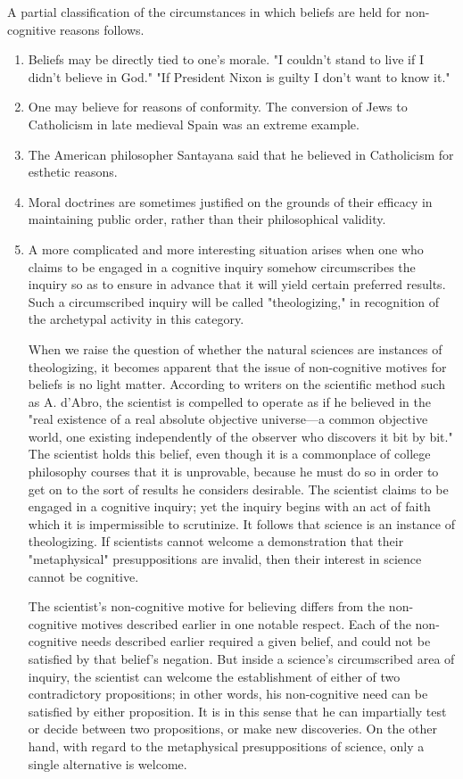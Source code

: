 \documentclass[10pt,twoside,draft]{memoir}
\begin{document}
A partial classification of the circumstances in which beliefs are held for 
non-cognitive reasons follows. 

\begin{enumerate}
\item Beliefs may be directly tied to one's morale. "I couldn't stand to live if I didn't believe in God." "If President Nixon is guilty I don't want to know it." 

\item One may believe for reasons of conformity. The conversion of Jews to Catholicism in late medieval Spain was an extreme example. 

\item The American philosopher Santayana said that he believed in Catholicism for esthetic reasons. 

\item Moral doctrines are sometimes justified on the grounds of their efficacy in maintaining public order, rather than their philosophical validity. 

\item A more complicated and more interesting situation arises when one 
who claims to be engaged in a cognitive inquiry somehow circumscribes the 
inquiry so as to ensure in advance that it will yield certain preferred results. 
Such a circumscribed inquiry will be called "theologizing," in recognition of 
the archetypal activity in this category. 

When we raise the question of whether the natural sciences are 
instances of theologizing, it becomes apparent that the issue of non-cognitive 
motives for beliefs is no light matter. According to writers on the scientific 
method such as A. d'Abro, the scientist is compelled to operate as if he 
believed in the "real existence of a real absolute objective universe---a 
common objective world, one existing independently of the observer who 
discovers it bit by bit." The scientist holds this belief, even though it is a 
commonplace of college philosophy courses that it is unprovable, because he 
must do so in order to get on to the sort of results he considers desirable. 
The scientist claims to be engaged in a cognitive inquiry; yet the inquiry 
begins with an act of faith which it is impermissible to scrutinize. It follows 
that science is an instance of theologizing. If scientists cannot welcome a 
demonstration that their "metaphysical" presuppositions are invalid, then 
their interest in science cannot be cognitive. 

The scientist's non-cognitive motive for believing differs from the 
non-cognitive motives described earlier in one notable respect. Each of the 
non-cognitive needs described earlier required a given belief, and could not 
be satisfied by that belief's negation. But inside a science's circumscribed 
area of inquiry, the scientist can welcome the establishment of either of two 
contradictory propositions; in other words, his non-cognitive need can be 
satisfied by either proposition. It is in this sense that he can impartially test 
or decide between two propositions, or make new discoveries. On the other 
hand, with regard to the metaphysical presuppositions of science, only a 
single alternative is welcome. 


\end{enumerate}
\end{document}
